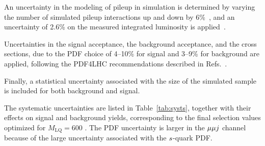 An uncertainty in the modeling of pileup in simulation is determined by varying the number of simulated pileup interactions up and down by 6\%~\cite{pileupuncert}, and an uncertainty of 2.6\% on the measured integrated luminosity is applied~\cite{CMS-PAS-LUM-13-001}.

Uncertainties in the signal acceptance, the background acceptance, and the cross sections, due to the PDF choice of 4--10\% for signal and 3--9\% for background are applied, following the PDF4LHC recommendations described in Refs.~\cite{PDF4LHC,Alekhin:2011sk}.

Finally, a statistical uncertainty associated with the size of the simulated sample is included for both background and signal. 

The systematic uncertainties are listed in Table~\ref{tab:systs}, together with their effects on signal and background yields, corresponding to the final selection values optimized for $M_{\text{LQ}} = 600$ \GeV.  The PDF uncertainty is larger in the ${\mu} {\mu} j$ channel because of the large uncertainty associated with the $\relax{s}$-quark PDF.


